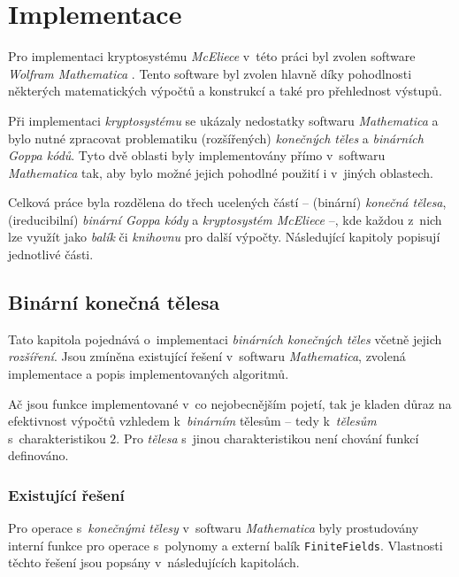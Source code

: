 \documentclass[thesis=M,czech,hidelinks]{FITthesis}[2012/06/26]
\newcommand{\0}{{\textcolor[gray]{0.80}{0}}}
\begin{document}
\chapter{Implementace}\label{kap_implementace}
Pro implementaci kryptosystému \emph{McEliece} v~této práci byl zvolen software
\emph{Wolfram Mathematica} \cite{Mathematica}. Tento software byl zvolen hlavně
díky pohodlnosti některých matematických výpočtů a konstrukcí a také pro
přehlednost výstupů. %

Při implementaci \emph{kryptosystému} se ukázaly nedostatky softwaru
\emph{Mathematica} a bylo nutné zpracovat problematiku (rozšířených)
\emph{konečných těles} a \emph{binárních Goppa kódů}. Tyto dvě oblasti byly
implementovány přímo v~softwaru \emph{Mathematica} tak, aby bylo možné jejich
pohodlné použití i v~jiných oblastech.

Celková práce byla rozdělena do třech ucelených částí -- (binární) \emph{konečná
tělesa}, (ireducibilní) \emph{binární Goppa kódy} a \emph{kryptosystém
McEliece} --, kde každou z~nich lze využít jako \emph{balík} či \emph{knihovnu}
pro další výpočty. Následující kapitoly popisují jednotlivé části.


\section{Binární konečná tělesa}
Tato kapitola pojednává o~implementaci \emph{binárních konečných těles} včetně
jejich \emph{rozšíření}. Jsou zmíněna existující řešení v~softwaru
\emph{Mathematica}, zvolená implementace a popis implementovaných algoritmů.

Ač jsou funkce implementované v~co nejobecnějším pojetí, tak je kladen důraz na
efektivnost výpočtů vzhledem k~\emph{binárním} tělesům -- tedy k~\emph{tělesům}
s~charakteristikou $2$. Pro \emph{tělesa} s~jinou charakteristikou není chování
funkcí definováno.

\subsection{Existující řešení}
Pro operace s~\emph{konečnými tělesy} v~softwaru \emph{Mathematica} byly
prostudovány interní funkce pro operace s~polynomy a externí balík
\texttt{FiniteFields}. Vlastnosti těchto řešení jsou popsány v~následujících
kapitolách.
\end{document}
